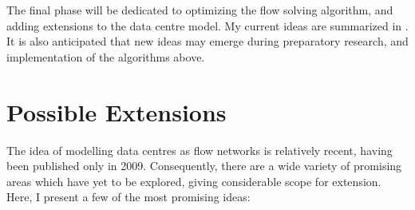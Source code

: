 The final phase will be dedicated to optimizing the flow solving algorithm, and adding extensions to the data centre model. My current ideas are summarized in . It is also anticipated that new ideas may emerge during preparatory research, and implementation of the algorithms above.

\section*{Possible Extensions}
\label{sec:extensions}

The idea of modelling data centres as flow networks is relatively recent, having been published only in 2009. Consequently, there are a wide variety of promising areas which have yet to be explored, giving considerable scope for extension. Here, I present a few of the most promising ideas:

